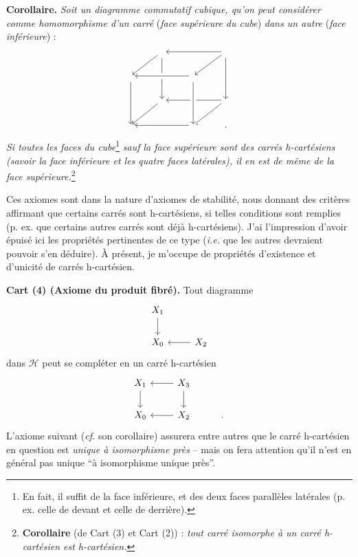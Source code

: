 \documentclass[11pt]{article}
\newcommand{\msp}[1]{\marginpar{\footnotesize [#1]}}
\begin{document}
\noindent\textbf{Corollaire.} \textit{Soit un diagramme commutatif cubique, qu'on peut considérer comme homomorphisme d'un carré} (\textit{face supérieure du cube}) \textit{dans un autre} (\textit{face inférieure}) :
\[
\begin{tikzcd}
 & {} \arrow[dl] \arrow[dd] & & {} \arrow[ll] \arrow[dl] \arrow[dd] \\
{} \arrow[dd] & & {} \arrow[ll, crossing over] & \\
 & {} \arrow[dl] & & {} \arrow[ll] \arrow[dl] \\
{} & & {} \arrow[ll] \arrow[from=uu, crossing over] & .
\end{tikzcd}
\]
\textit{Si toutes les faces du cube}\footnote{En fait, il suffit de la face inférieure, et des deux faces parallèles latérales (p. ex. celle de devant et celle de derrière).} \textit{sauf la face supérieure sont} \msp{page 4} \textit{des carrés h-cartésiens (savoir la face inférieure et les quatre faces latérales), il en est de même de la face supérieure.}\footnote{\textbf{Corollaire} (de Cart (3) et Cart (2)) : \textit{tout carré isomorphe à un carré h-cartésien est h-cartésien.}}

\noindent Ces axiomes sont dans la nature d'axiomes de stabilité, nous donnant des critères affirmant que certains carrés sont h-cartésiens, si telles conditions sont remplies (p. ex. que certains autres carrés sont déjà h-cartésiens). J'ai l'impression d'avoir épuisé ici les propriétés pertinentes de ce type (\textit{i.e.} que les autres devraient pouvoir s'en déduire). À présent, je m'occupe de propriétés d'existence et d'unicité de carrés h-cartésien. %

\noindent\textbf{Cart (4) (Axiome du produit fibré).} Tout diagramme
\[
\begin{tikzcd}
X_1 \arrow[d] & \\
X_0 & X_2 \arrow[l]
\end{tikzcd}
\]
dans $\mathcal{H}$ peut se compléter en un carré h-cartésien
\[
\begin{tikzcd}
X_1 \arrow[d] & X_3 \arrow[l] \arrow[d] & \\
X_0 & X_2 \arrow[l] & .
\end{tikzcd}
\]
L'axiome suivant (\textit{cf.} son corollaire) assurera entre autres que le carré h-cartésien en question est \textit{unique à isomorphisme près} – mais on fera attention qu'il n'est en général pas unique “à isomorphisme unique près”.
\end{document}
